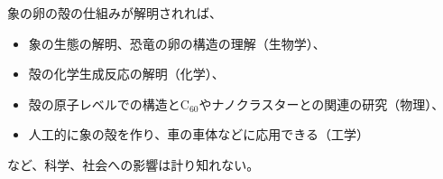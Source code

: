 \documentclass[11pt,a4j,dvipdfmx]{jarticle} 					%
\newcommand{\研究課題名}{象の卵}
\newcommand{\研究機関名}{逢坂大学}
\newcommand{\研究代表者氏名}{湯川秀樹}
\newcommand{\研究期間の最終元号年度}{8}  %
\begin{document}
	象の卵の殻の仕組みが解明されれば、
	\begin{itemize}
		\item 象の生態の解明、恐竜の卵の構造の理解（生物学）、
		\item 殻の化学生成反応の解明（化学）、
		\item 殻の原子レベルでの構造とC$_{60}$やナノクラスターとの関連の研究（物理）、
		\item 人工的に象の殻を作り、車の車体などに応用できる（工学）
	\end{itemize}
	など、科学、社会への影響は計り知れない。	



\end{document}
